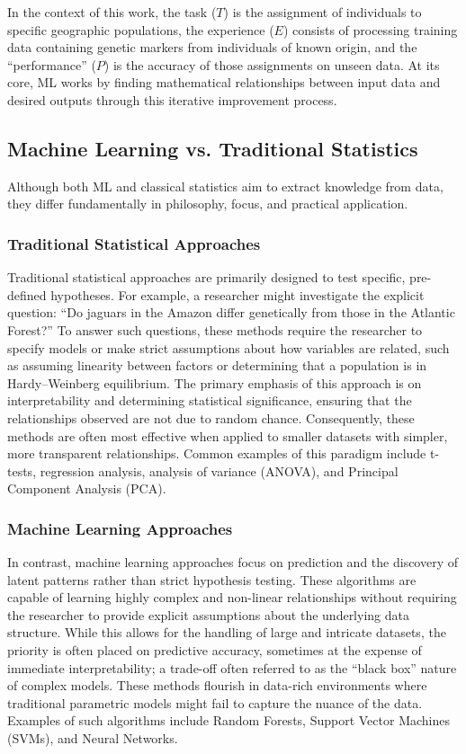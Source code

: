 In the context of this work, the task ($T$) is the assignment of individuals to specific geographic populations, the experience ($E$) consists of processing training data containing genetic markers from individuals of known origin, and the ``performance'' ($P$) is the accuracy of those assignments on unseen data. At its core, ML works by finding mathematical relationships between input data and desired outputs through this iterative improvement process.

\subsection{Machine Learning vs. Traditional Statistics}

Although both ML and classical statistics aim to extract knowledge from data, they differ fundamentally in philosophy, focus, and practical application.

\subsubsection{Traditional Statistical Approaches}

Traditional statistical approaches are primarily designed to test specific, pre-defined hypotheses. For example, a researcher might investigate the explicit question: ``Do jaguars in the Amazon differ genetically from those in the Atlantic Forest?'' To answer such questions, these methods require the researcher to specify models or make strict assumptions about how variables are related, such as assuming linearity between factors or determining that a population is in Hardy–Weinberg equilibrium. The primary emphasis of this approach is on interpretability and determining statistical significance, ensuring that the relationships observed are not due to random chance. Consequently, these methods are often most effective when applied to smaller datasets with simpler, more transparent relationships. Common examples of this paradigm include t-tests, regression analysis, analysis of variance (ANOVA), and Principal Component Analysis (PCA).

\subsubsection{Machine Learning Approaches}

In contrast, machine learning approaches focus on prediction and the discovery of latent patterns rather than strict hypothesis testing. These algorithms are capable of learning highly complex and non-linear relationships without requiring the researcher to provide explicit assumptions about the underlying data structure. While this allows for the handling of large and intricate datasets, the priority is often placed on predictive accuracy, sometimes at the expense of immediate interpretability; a trade-off often referred to as the ``black box'' nature of complex models. These methods flourish in data-rich environments where traditional parametric models might fail to capture the nuance of the data. Examples of such algorithms include Random Forests, Support Vector Machines (SVMs), and Neural Networks.

